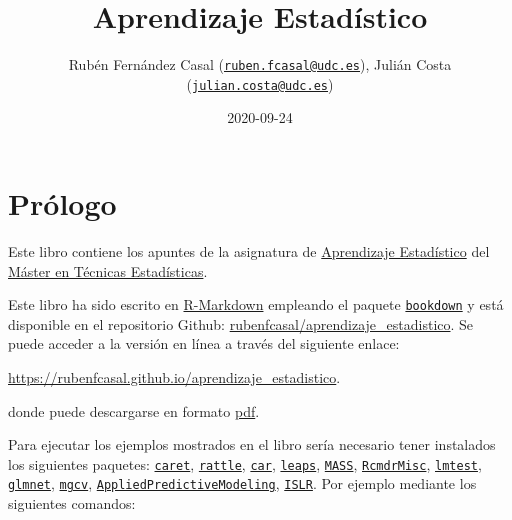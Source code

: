 \documentclass[]{book}
\title{Aprendizaje Estadístico}
\author{Rubén Fernández Casal
(\href{mailto:ruben.fcasal@udc.es}{\nolinkurl{ruben.fcasal@udc.es}}),
Julián Costa
(\href{mailto:julian.costa@udc.es}{\nolinkurl{julian.costa@udc.es}})}
\date{2020-09-24}
\theoremstyle{break}
\theoremstyle{definition}
\theoremstyle{definition}
\theoremstyle{definition}
\theoremstyle{remark}
\begin{document}
\maketitle

{
\setcounter{tocdepth}{1}
\tableofcontents
}
\chapter*{Prólogo}\label{pruxf3logo}

Este libro contiene los apuntes de la asignatura de
\href{http://eamo.usc.es/pub/mte/index.php?option=com_content\&view=article\&id=74}{Aprendizaje
Estadístico} del \href{http://eio.usc.es/pub/mte}{Máster en Técnicas
Estadísticas}.

Este libro ha sido escrito en
\href{http://rmarkdown.rstudio.com}{R-Markdown} empleando el paquete
\href{https://bookdown.org/yihui/bookdown/}{\texttt{bookdown}} y está
disponible en el repositorio Github:
\href{https://github.com/rubenfcasal/aprendizaje_estadistico}{rubenfcasal/aprendizaje\_estadistico}.
Se puede acceder a la versión en línea a través del siguiente enlace:

\url{https://rubenfcasal.github.io/aprendizaje_estadistico}.

donde puede descargarse en formato
\href{https://rubenfcasal.github.io/aprendizaje_estadistico/aprendizaje_estadistico.pdf}{pdf}.

Para ejecutar los ejemplos mostrados en el libro sería necesario tener
instalados los siguientes paquetes:
\href{https://CRAN.R-project.org/package=caret}{\texttt{caret}},
\href{https://CRAN.R-project.org/package=rattle}{\texttt{rattle}},
\href{https://CRAN.R-project.org/package=car}{\texttt{car}},
\href{https://CRAN.R-project.org/package=leaps}{\texttt{leaps}},
\href{https://CRAN.R-project.org/package=MASS}{\texttt{MASS}},
\href{https://CRAN.R-project.org/package=RcmdrMisc}{\texttt{RcmdrMisc}},
\href{https://CRAN.R-project.org/package=lmtest}{\texttt{lmtest}},
\href{https://CRAN.R-project.org/package=glmnet}{\texttt{glmnet}},
\href{https://CRAN.R-project.org/package=mgcv}{\texttt{mgcv}},
\href{https://CRAN.R-project.org/package=AppliedPredictiveModeling}{\texttt{AppliedPredictiveModeling}},
\href{https://CRAN.R-project.org/package=ISLR}{\texttt{ISLR}}. Por
ejemplo mediante los siguientes comandos:
\end{document}
